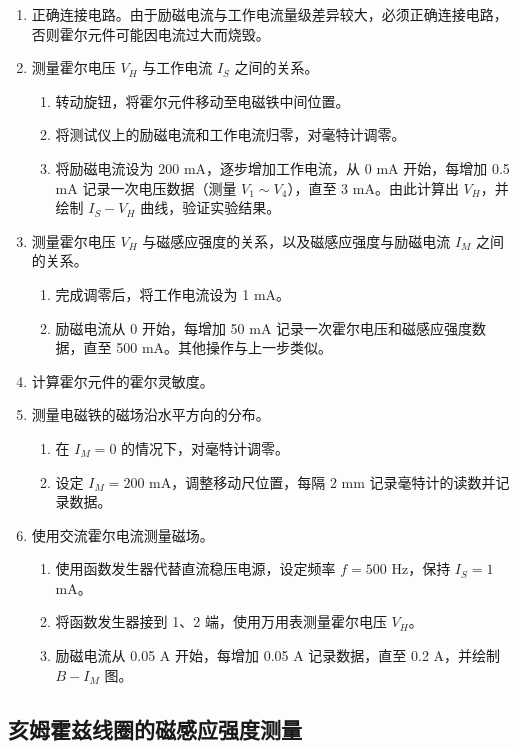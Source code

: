 \documentclass[a4paper,10pt]{article}
\begin{document}
\begin{enumerate}
    \item 正确连接电路。由于励磁电流与工作电流量级差异较大，必须正确连接电路，否则霍尔元件可能因电流过大而烧毁。
    \item 测量霍尔电压 \( V_H \) 与工作电流 \( I_S \) 之间的关系。
    \begin{enumerate}
        \item 转动旋钮，将霍尔元件移动至电磁铁中间位置。
        \item 将测试仪上的励磁电流和工作电流归零，对毫特计调零。
        \item 将励磁电流设为 200 mA，逐步增加工作电流，从 0 mA 开始，每增加 0.5 mA 记录一次电压数据（测量 \( V_1 \sim V_4 \)），直至 3 mA。由此计算出 \( V_H \)，并绘制 \( I_S - V_H \) 曲线，验证实验结果。
    \end{enumerate}
    \item 测量霍尔电压 \( V_H \) 与磁感应强度的关系，以及磁感应强度与励磁电流 \( I_M \) 之间的关系。
    \begin{enumerate}
        \item 完成调零后，将工作电流设为 1 mA。
        \item 励磁电流从 0 开始，每增加 50 mA 记录一次霍尔电压和磁感应强度数据，直至 500 mA。其他操作与上一步类似。
    \end{enumerate}
    \item 计算霍尔元件的霍尔灵敏度。
    \item 测量电磁铁的磁场沿水平方向的分布。
    \begin{enumerate}
        \item 在 \( I_M = 0 \) 的情况下，对毫特计调零。
        \item 设定 \( I_M = 200 \) mA，调整移动尺位置，每隔 2 mm 记录毫特计的读数并记录数据。
    \end{enumerate}
    \item 使用交流霍尔电流测量磁场。
    \begin{enumerate}
        \item 使用函数发生器代替直流稳压电源，设定频率 \( f = 500 \) Hz，保持 \( I_S = 1 \) mA。
        \item 将函数发生器接到 1、2 端，使用万用表测量霍尔电压 \( V_H \)。
        \item 励磁电流从 0.05 A 开始，每增加 0.05 A 记录数据，直至 0.2 A，并绘制 \( B - I_M \) 图。
    \end{enumerate}
\end{enumerate}


\subsection{亥姆霍兹线圈的磁感应强度测量}
\end{document}
